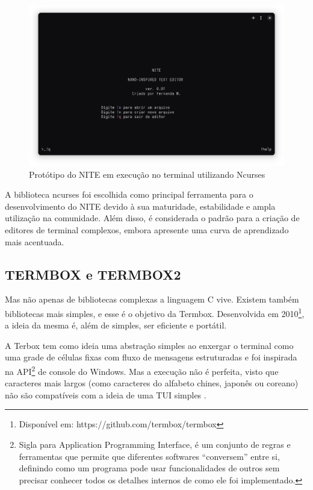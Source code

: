 \FloatBarrier
\begin{figure}[!htbp]
    \centering
    \caption{Protótipo do NITE em execução no terminal utilizando Ncurses}
    \includegraphics[scale=0.3]{imagens/NITE.png}
\end{figure}
\FloatBarrier

A biblioteca ncurses foi escolhida como principal ferramenta para o desenvolvimento
do NITE devido à sua maturidade, estabilidade e ampla utilização na comunidade. Além
disso, é considerada o padrão para a criação de editores de terminal complexos, embora
apresente uma curva de aprendizado mais acentuada.

\subsection{TERMBOX e TERMBOX2}

Mas não apenas de bibliotecas complexas a linguagem C vive. Existem também bibliotecas
mais simples, e esse é o objetivo da Termbox. Desenvolvida em 2010\footnote{Disponível
em: https://github.com/termbox/termbox}, a ideia da mesma é, além de simples, ser
eficiente e portátil.

A Terbox tem como ideia uma abstração simples ao enxergar o terminal como uma grade
de células fixas com fluxo de mensagens estruturadas e foi inspirada na API\footnote{Sigla
para Application Programming Interface, é um conjunto de regras e ferramentas que
permite que diferentes softwares “conversem” entre si, definindo como um
programa pode usar funcionalidades de outros sem precisar conhecer todos os
detalhes internos de como ele foi implementado.} de console do Windows. Mas a execução
não é perfeita, visto que caracteres mais largos (como caracteres do alfabeto chines,
japonês ou coreano) não são compatíveis com a ideia de uma TUI simples \cite{termbox_googlecode}.

